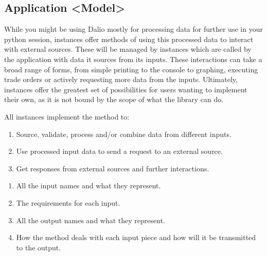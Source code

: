 \documentclass[letterpaper,10pt,english]{sphinxmanual}
\begin{document}
\subsection{Application \textless{}Model\textgreater{}}
\label{\detokenize{beginners-guide:application-model}}

While you might be using Dal\sphinxhyphen{}io mostly for processing data for further use in your python session,  instances offer methods of using this processed data to interact with external sources. These will be managed by  instances which are called by the application with data it sources from its inputs. These interactions can take a broad range of forms, from simple printing to the console to graphing, executing trade orders or actively requesting more data from the inputs. Ultimately,  instances offer the greatest set of possibilities for users wanting to implement their own, as it is not bound by the scope of what the library can do.

All  instances implement the  method to:
\begin{enumerate}
%
\item {} 
Source, validate, process and/or combine data from different inputs.

\item {} 
Use processed input data to send a request to an external source.

\item {} 
Get responses from external sources and further interactions.

\end{enumerate}

\begin{enumerate}
%
\item {} 
All the input names and what they represent.

\item {} 
The requirements for each input.

\item {} 
All the output names and what they represent.

\item {} 
How the  method deals with each input piece and how will it be transmitted to the output.

\end{enumerate}
\end{document}
